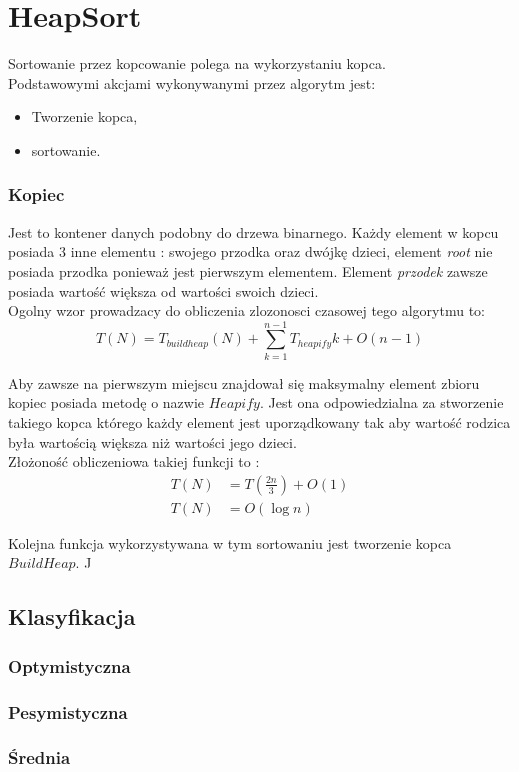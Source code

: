 \section{HeapSort}
Sortowanie przez kopcowanie polega na wykorzystaniu kopca.\\
 Podstawowymi akcjami wykonywanymi przez algorytm jest:
\begin{itemize}
\item Tworzenie kopca,
\item sortowanie.
\end{itemize}

\subsubsection{Kopiec}
Jest to kontener danych podobny do drzewa binarnego\cite{heapsort}. Każdy element w kopcu posiada 3 inne elementu : swojego przodka oraz dwójkę dzieci, element \textit{root} nie posiada przodka ponieważ jest pierwszym elementem. 
Element \textit{przodek} zawsze posiada wartość większa od wartości swoich dzieci.	\\
Ogolny wzor prowadzacy do obliczenia zlozonosci czasowej tego algorytmu to:
\begin{equation}
T(N) = T_{buildheap}(N) +\sum_{k=1}^{n-1} T_{heapify}k + O(n-1)
\end{equation}

Aby zawsze na pierwszym miejscu znajdował się maksymalny element zbioru kopiec posiada metodę o nazwie $Heapify$. Jest ona odpowiedzialna za stworzenie takiego kopca którego każdy element jest uporządkowany tak aby wartość rodzica była wartością większa niż wartości jego dzieci.\\
Złożoność obliczeniowa takiej funkcji to :
\begin{align*}
T(N) &= T(\frac{2n}{3}) + O(1) \\
T(N) &=O(\log n)
\end{align*} 
\par Kolejna funkcja wykorzystywana w tym sortowaniu jest tworzenie kopca $BuildHeap$.
J
\subsection{Klasyfikacja}
\subsubsection{Optymistyczna}

\subsubsection{Pesymistyczna}


\subsubsection{Średnia}
